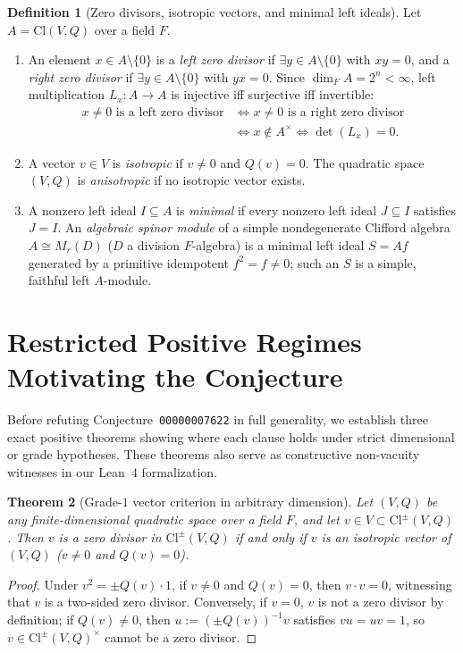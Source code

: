 \documentclass[11pt]{article}
\newtheorem{theorem}{Theorem}[section]
\theoremstyle{definition}
\newtheorem{definition}[theorem]{Definition}
\newcommand{\Cl}{\mathrm{Cl}}
\begin{document}
\begin{definition}[Zero divisors, isotropic vectors, and minimal left ideals]
Let $A = \Cl(V, Q)$ over a field $F$.
\begin{enumerate}
  \item An element $x \in A \setminus \{0\}$ is a \emph{left zero divisor} if
    $\exists y \in A \setminus \{0\}$ with $xy = 0$, and a \emph{right zero divisor}
    if $\exists y \in A \setminus \{0\}$ with $yx = 0$. Since $\dim_F A = 2^n < \infty$,
    left multiplication $L_x : A \to A$ is injective iff surjective iff invertible:
    \begin{align*}
      x \neq 0 \text{ is a left zero divisor}
      &\iff x \neq 0 \text{ is a right zero divisor} \\
      &\iff x \notin A^\times \iff \det(L_x) = 0.
    \end{align*}
  \item A vector $v \in V$ is \emph{isotropic} if $v \neq 0$ and $Q(v) = 0$. The
    quadratic space $(V, Q)$ is \emph{anisotropic} if no isotropic vector exists.
  \item A nonzero left ideal $I \subseteq A$ is \emph{minimal} if every nonzero
    left ideal $J \subseteq I$ satisfies $J = I$. An \emph{algebraic spinor module}
    of a simple nondegenerate Clifford algebra $A \cong M_r(D)$ ($D$ a division
    $F$-algebra) is a minimal left ideal $S = A f$ generated by a primitive
    idempotent $f^2 = f \neq 0$; such an $S$ is a simple, faithful left $A$-module.
\end{enumerate}
\end{definition}

\section{Restricted Positive Regimes Motivating the Conjecture}

Before refuting Conjecture~\texttt{00000007622} in full generality, we establish
three exact positive theorems showing where each clause holds under strict
dimensional or grade hypotheses. These theorems also serve as constructive
non-vacuity witnesses in our Lean~4 formalization.

\begin{theorem}[Grade-$1$ vector criterion in arbitrary dimension]
\label{thm:grade1}
Let $(V, Q)$ be any finite-dimensional quadratic space over a field $F$, and let
$v \in V \subset \Cl^\pm(V, Q)$. Then $v$ is a zero divisor in $\Cl^\pm(V, Q)$
if and only if $v$ is an isotropic vector of $(V, Q)$ ($v \neq 0$ and $Q(v) = 0$).
\end{theorem}
\begin{proof}
Under $v^2 = \pm Q(v)\cdot 1$, if $v \neq 0$ and $Q(v) = 0$, then $v \cdot v = 0$,
witnessing that $v$ is a two-sided zero divisor. Conversely, if $v = 0$, $v$ is
not a zero divisor by definition; if $Q(v) \neq 0$, then $u := (\pm Q(v))^{-1} v$
satisfies $vu = uv = 1$, so $v \in \Cl^\pm(V, Q)^\times$ cannot be a zero divisor.
\end{proof}
\end{document}
